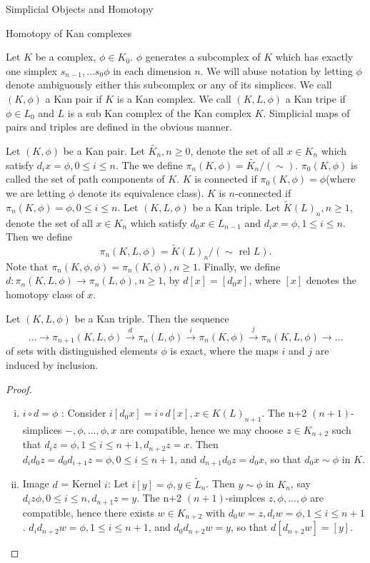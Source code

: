 \documentclass[a4,20pt,twosides]{book}
\begin{document}
\begin{chapter}{Simplicial Objects and Homotopy}
\begin{section}{Homotopy of Kan complexes}
	\begin{nota}
		Let $K$ be a complex, $\phi \in K_0$. $\phi$ generates a subcomplex of $K$ which has exactly one simplex $s_{n-1}, \dots s_0 \phi$ in each dimension $n$. We will abuse notation by letting $\phi$ denote ambiguously either this subcomplex or any of its simplices. We call $(K, \phi)$ a Kan pair if $K$ is a Kan complex. We call $(K, L, \phi)$ a Kan tripe if $\phi \in L_0$ and $L$ is a sub Kan complex of the Kan complex $K$. Simplicial maps of pairs and triples are defined in the obvious manner. 
	\end{nota}
	\begin{chdefn}
		Let $(K, \phi)$ be a Kan pair. Let $\tilde{K_n}, n \geq 0$, denote the set of all $x \in K_n$ which satisfy $d_i x = \phi, 0 \leq i \leq n$. The we define $\pi_n(K, \phi) = \tilde{K_n} \big/ (\sim)$. $\pi_0 (K, \phi)$ is called the set of path components of $K$. $K$ is connected if $\pi_0 (K, \phi) = \phi$(where we are letting $\phi$ denote its equivalence class). $K$ is $n$-connected if $\pi_n (K, \phi) = \phi, 0 \leq i \leq n$. Let $(K, L, \phi)$ be a Kan triple. Let $\tilde{K}(L)_n, n \geq 1$, denote the set of all $x \in K_n$ which satisfy $d_0 x \in L_{n-1}$ and $d_i x = \phi, 1 \leq i \leq n$. Then we define
		\[
		\pi_n (K, L, \phi) = \tilde{K}(L)_n \big/ (\sim \text{ rel }L ).
		\]
		Note that $\pi_n (K, \phi, \phi)= \pi_n (K, \phi), n \geq 1$. Finally, we define $d: \pi_n(K,L, \phi) \rightarrow \pi_n(L, \phi), n \geq 1$, by $d[x]=[d_0 x]$, where $[x]$ denotes the homotopy class of $x$.
	\end{chdefn}
	\begin{chthm}
		Let $(K, L, \phi)$ be a Kan triple. Then the sequence
		\[
		\dots \rightarrow \pi_{n+1}(K,L,\phi) \xrightarrow{d} \pi_{n}(L,\phi) \xrightarrow{i} \pi_{n}(K,\phi) \xrightarrow{j} \pi_{n}(K,L,\phi) \rightarrow \dots
		\]
		of sets with distinguished elements $\phi$ is exact, where the maps $i$ and $j$ are induced by inclusion.
	\end{chthm}
	\begin{proof}
		\begin{enumerate}[(i)] 
			\item $ i\circ d = \phi$ : Consider $i [d_0 x]= i \circ d[x], x \in K(L)_{n+1}$. The n+2 $(n+1)$-simplices $-, \phi, \dots, \phi, x$ are compatible, hence we may choose $z \in K_{n+2}$ such that $d_i z = \phi, 1 \leq i \leq n+1, d_{n+2} z =x$. Then $d_{i} d_{0} z = d_0 d_{i+1} z = \phi, 0 \leq i \leq n+1$, and $d_{n+1} d _0 z = d_0 x$, so that $d_0 x \sim \phi$ in $K$.
			\item Image $d$ = Kernel $i$: Let $i[y] = \phi, y \in \tilde{L}_n$. Then $y \sim \phi$ in $K_n$, say $d_i z \phi, 0 \leq i \leq n, d_{n+1}z = y$. The n+2 $(n+1)$-simplces $z, \phi,\dots,\phi$ are compatible, hence there exists $w \in K_{n+2}$ with $d_0 w = z, d_i w = \phi , 1 \leq i \leq n+1$. $d_i d_{n+2} w = \phi, 1\leq i \leq n+1$, and $d_0 d_{n+2} w = y$, so that $d[d_{n+2} w] =[y]$.

\end{enumerate}
\end{proof}
\end{section}
\end{chapter}
\end{document}
